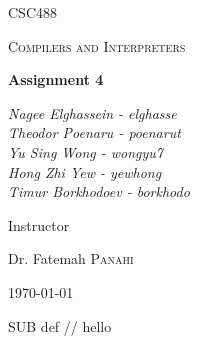 \documentclass[12pt]{article}
\begin{document}
\begin{titlepage}
	\centering
	{\scshape\LARGE CSC488 \par}
	\vspace{1cm}
	{\scshape\Large Compilers and Interpreters \par}
	\vspace{1.5cm}
	{\huge\bfseries Assignment 4 \par}
	\vspace{2cm}
	{\Large\itshape
  Nagee Elghassein -   elghasse \\ 
Theodor Poenaru    - poenarut   \\ 
Yu Sing Wong       - wongyu7    \\ 
Hong Zhi Yew       - yewhong    \\ 
Timur Borkhodoev   - borkhodo    
  \par}
	\vfill
	Instructor\par
	Dr. Fatemah \textsc{Panahi}

	\vfill

	{\large \today\par}
\end{titlepage}
\tableofcontents


\begin{code}
  SUB def // hello
\end{code}






\end{document}
